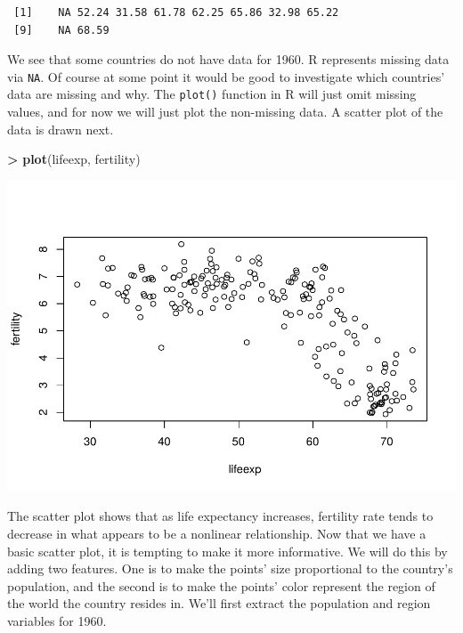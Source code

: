 \documentclass[
]{krantz}
\makeatletter
\newenvironment{Shaded}{\begin{snugshade}}{\end{snugshade}}
\newcommand{\DecValTok}[1]{\textcolor[rgb]{0.06,0.06,0.06}{#1}}
\newcommand{\KeywordTok}[1]{\textcolor[rgb]{0.27,0.27,0.27}{\textbf{#1}}}
\newcommand{\NormalTok}[1]{#1}
\newcommand{\OperatorTok}[1]{\textcolor[rgb]{0.43,0.43,0.43}{\textbf{#1}}}
\newcommand{\StringTok}[1]{\textcolor[rgb]{0.5,0.5,0.5}{#1}}
\newenvironment{kframe}{%
\medskip{}
\setlength{\fboxsep}{.8em}
 \def\at@end@of@kframe{}%
 \ifinner\ifhmode%
  \def\at@end@of@kframe{\end{minipage}}%
  \begin{minipage}{\columnwidth}%
 \fi\fi%
 \def\FrameCommand##1{\hskip\@totalleftmargin \hskip-\fboxsep
 \colorbox{shadecolor}{##1}\hskip-\fboxsep
     \hskip-\linewidth \hskip-\@totalleftmargin \hskip\columnwidth}%
 \MakeFramed {\advance\hsize-\width
   \@totalleftmargin\z@ \linewidth\hsize
   \@setminipage}}%
 {\par\unskip\endMakeFramed%
 \at@end@of@kframe}
\renewenvironment{Shaded}{\begin{kframe}}{\end{kframe}}
\makeatother
\begin{document}
\begin{verbatim}
 [1]    NA 52.24 31.58 61.78 62.25 65.86 32.98 65.22
 [9]    NA 68.59
\end{verbatim}

We see that some countries do not have data for 1960. R represents missing data via \texttt{NA}. Of course at some point it would be good to investigate which countries' data are missing and why. The \texttt{plot()} function in R will just omit missing values, and for now we will just plot the non-missing data. A scatter plot of the data is drawn next.

\begin{Shaded}
\begin{Highlighting}[]
\OperatorTok{\textgreater{}}\StringTok{ }\KeywordTok{plot}\NormalTok{(lifeexp, fertility)}
\end{Highlighting}
\end{Shaded}

\includegraphics{bookdown_files/figure-latex/unnamed-chunk-13-1.pdf}

The scatter plot shows that as life expectancy increases, fertility rate tends to decrease in what appears to be a nonlinear relationship. Now that we have a basic scatter plot, it is tempting to make it more informative. We will do this by adding two features. One is to make the points' size proportional to the country's population, and the second is to make the points' color represent the region of the world the country resides in. We'll first extract the population and region variables for 1960.

\begin{Shaded}
\end{Shaded}
\end{document}
